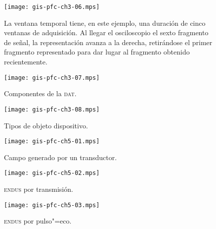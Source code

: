 \documentclass[a4paper,12pt]				{article}
\begin{document}
\begin{figure}
	\begin{center}
		\texttt{[image: gis-pfc-ch3-06.mps]}
	\end{center}
	\caption[Modo de funcionamiento continuo]{La ventana temporal
	tiene, en este ejemplo, una duración de cinco ventanas de
	adquisición. Al llegar el osciloscopio el sexto fragmento de señal,
	la representación avanza a la derecha, retirándose el primer
	fragmento representado para dar lugar al fragmento obtenido
	recientemente.}
	\label{fig:digcontosccont}
\end{figure}

\clearpage

\begin{figure}
	\begin{center}
		\texttt{[image: gis-pfc-ch3-07.mps]}
	\end{center}
	\caption[Componentes de la \textsc{dat}]{Componentes de la
	\textsc{dat}.}
	\label{fig:dat}
\end{figure}

\begin{figure}
	\begin{center}
		\texttt{[image: gis-pfc-ch3-08.mps]}
	\end{center}
	\caption[Tipos de objeto dispositivo]{Tipos de objeto dispositivo.}
	\label{fig:devobject}
\end{figure}

\begin{figure}
	\begin{center}
		\texttt{[image: gis-pfc-ch5-01.mps]}
	\end{center}
	\caption[Campo generado por un transductor]{Campo generado por un
	transductor.}
	\label{fig:field}
\end{figure}

\begin{figure}
	\begin{center}
		\texttt{[image: gis-pfc-ch5-02.mps]}
	\end{center}
	\caption[\textsc{endus} por transmisión]{\textsc{endus} por
	transmisión.}
	\label{fig:transmission}
\end{figure}

\clearpage

\begin{figure}
	\begin{center}
		\texttt{[image: gis-pfc-ch5-03.mps]}
	\end{center}
	\caption[\textsc{endus} por pulso"=eco]{\textsc{endus} por
	pulso"=eco.}
	\label{fig:echo}
\end{figure}
\end{document}
